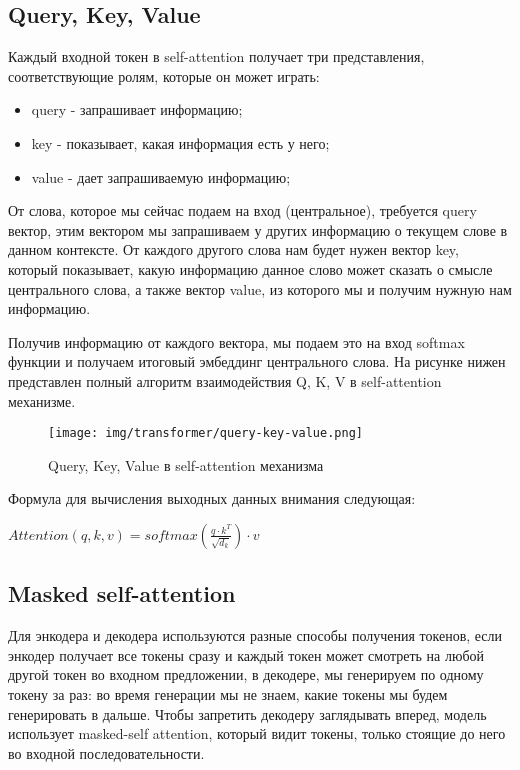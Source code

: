 \documentclass[PMI,KR]{HSEUniversity}
\begin{document}
\newpage
\subsection{Query, Key, Value}

Каждый входной токен в self-attention получает три представления, соответствующие ролям, которые он может играть:
\begin{itemize}
    \item query - запрашивает информацию;
    \item key - показывает, какая информация есть у него;
    \item value - дает запрашиваемую информацию;
\end{itemize}

От слова, которое мы сейчас подаем на вход (центральное), требуется query вектор, этим вектором мы запрашиваем у других информацию о текущем слове в данном контексте. От каждого другого слова нам будет нужен вектор key, который показывает, какую информацию данное слово может сказать о смысле центрального слова, а также вектор value, из которого мы и получим нужную нам информацию.

Получив информацию от каждого вектора, мы подаем это на вход softmax функции и получаем итоговый эмбеддинг центрального слова. 
На рисунке нижен представлен полный алгоритм взаимодействия Q, K, V в self-attention механизме. 

\newpage
\begin{figure}[h]
    \centering
    \texttt{[image: img/transformer/query-key-value.png]}
    \caption{Query, Key, Value в self-attention механизма}
\end{figure}

Формула для вычисления выходных данных внимания следующая:

\begin{center}
$Attention(q, k, v) = softmax(\frac{q \cdot k^T}{\sqrt{d_k}}) \cdot v $
\end{center}

\subsection{Masked self-attention}

Для энкодера и декодера используются разные способы получения токенов, если энкодер получает все токены сразу и каждый токен может смотреть на любой другой токен во входном предложении, в декодере, мы генерируем по одному токену за раз: во время генерации мы не знаем, какие токены мы будем генерировать в дальше.
Чтобы запретить декодеру заглядывать вперед, модель использует masked-self attention, который видит токены, только стоящие до него во входной последовательности.
\end{document}
